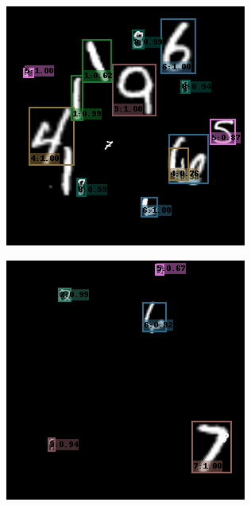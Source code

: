 \begin{figure}[h!]
\begin{subfigure}[b]{0.193\textwidth}
    \end{subfigure}
    \hfill
    \begin{subfigure}[b]{0.193\textwidth}
        \centering
        \includegraphics[width=\textwidth]{Images/mnist_output/6.png}
    \end{subfigure}
    \hfill
    \begin{subfigure}[b]{0.193\textwidth}
        \centering
        \includegraphics[width=\textwidth]{Images/mnist_output/7.png}

\end{subfigure}
\end{figure}
